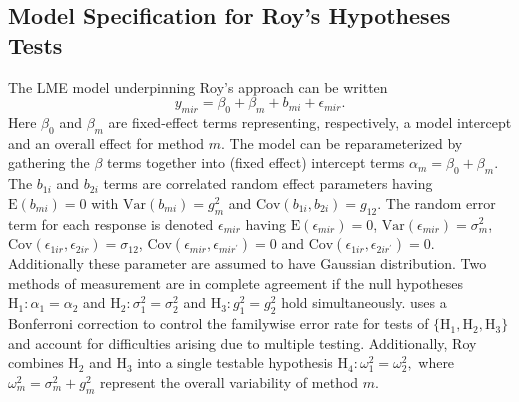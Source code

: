 \documentclass[12pt, a4paper]{report}
\theoremstyle{plain}
\theoremstyle{definition}
\theoremstyle{remark}
\begin{document}
	\subsection{Model Specification for Roy's Hypotheses Tests}
	The LME model underpinning Roy's approach can be written
	\begin{equation}\label{ARoy2009-model}
	y_{mir} = \beta_{0} + \beta_{m} + b_{mi} + \epsilon_{mir}.
	\end{equation}
	Here $\beta_0$ and $\beta_m$ are fixed-effect terms representing, respectively, a model intercept and an overall effect for method $m.$ The model can be reparameterized by gathering the $\beta$ terms together into (fixed effect) intercept terms $\alpha_m=\beta_0+\beta_m.$ The $b_{1i}$ and $b_{2i}$ terms are correlated random effect parameters having $\mathrm{E}(b_{mi})=0$ with $\mathrm{Var}(b_{mi})=g^2_m$ and $\mathrm{Cov}(b_{1i}, b_{2 i})=g_{12}.$ The random error term for each response is denoted $\epsilon_{mir}$ having $\mathrm{E}(\epsilon_{mir})=0$, $\mathrm{Var}(\epsilon_{mir})=\sigma^2_m$, $\mathrm{Cov}(\epsilon_{1ir}, \epsilon_{2 ir})=\sigma_{12}$, $\mathrm{Cov}(\epsilon_{mir}, \epsilon_{mir^\prime})= 0$ and $\mathrm{Cov}(\epsilon_{1ir}, \epsilon_{2 ir^\prime})= 0.$ Additionally these parameter are assumed to have Gaussian distribution. Two methods of measurement are in complete agreement if the null hypotheses $\mathrm{H}_1\colon \alpha_1 = \alpha_2$ and $\mathrm{H}_2\colon \sigma^2_1 = \sigma^2_2 $ and $\mathrm{H}_3\colon g^2_1= g^2_2$ hold simultaneously. \citet{ARoy2009} uses a Bonferroni correction to control the familywise error rate for tests of $\{\mathrm{H}_1, \mathrm{H}_2, \mathrm{H}_3\}$ and account for difficulties arising due to multiple testing. Additionally, Roy combines $\mathrm{H}_2$ and $\mathrm{H}_3$ into a single testable hypothesis $\mathrm{H}_4\colon \omega^2_1=\omega^2_2,$ where $\omega^2_m = \sigma^2_m + g^2_m$ represent the overall variability of method $m.$
	
	
%	
%	
\end{document}

